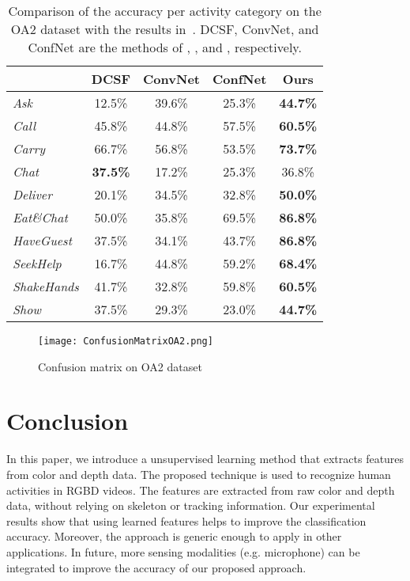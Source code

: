 \documentclass{article}
\begin{document}
\begin{table}[t]
\begin{center}
\caption{Comparison of the accuracy per activity category on the OA2 dataset with the results in~\cite{2014_Wang_ConvolutionalNetworks}. DCSF, ConvNet, and ConfNet are the methods of \cite{2013_Xia_DepthCuboid}, \cite{2013_Ji_3DNeuralNet}, and \cite{2014_Wang_ConvolutionalNetworks}, respectively.}
	\label{tab:OA2dataset2}
\begin{tabular}{|l|c|c|c|c|}
\hline
                    & DCSF       & ConvNet & ConfNet & Ours             \\ \hline
\textit{Ask}        & 12.5\%          & 39.6\%   & 25.3\%     & \textbf{44.7\%} \\ \hline
\textit{Call}       & 45.8\%          & 44.8\%   & 57.5\%     & \textbf{60.5\%} \\ \hline
\textit{Carry}      & 66.7\%          & 56.8\%   & 53.5\%     & \textbf{73.7\%} \\ \hline
\textit{Chat}       & \textbf{37.5\%} & 17.2\%   & 25.3\%     & 36.8\%          \\ \hline
\textit{Deliver}    & 20.1\%          & 34.5\%   & 32.8\%     & \textbf{50.0\%}    \\ \hline
\textit{Eat\&Chat}  & 50.0\%          & 35.8\%   & 69.5\%     & \textbf{86.8\%} \\ \hline
\textit{HaveGuest}  & 37.5\%          & 34.1\%   & 43.7\%     & \textbf{86.8\%} \\ \hline
\textit{SeekHelp}   & 16.7\%          & 44.8\%   & 59.2\%     & \textbf{68.4\%} \\ \hline
\textit{ShakeHands} & 41.7\%          & 32.8\%   & 59.8\%     & \textbf{60.5\%} \\ \hline
\textit{Show}       & 37.5\%          & 29.3\%   & 23.0\%     & \textbf{44.7\%} \\ \hline
\end{tabular}
\end{center}
\end{table}

\begin{figure}[!htb]
	\centering
	\texttt{[image: ConfusionMatrixOA2.png]}
	\caption{Confusion matrix on OA2 dataset~\cite{2014_Wang_ConvolutionalNetworks}}
	\label{fig:confusionmatrixoa2}
\end{figure}

\section{Conclusion}
\label{sec:conclusion}
In this paper, we introduce a unsupervised learning method that extracts features from color and depth data.
The proposed technique is used to recognize human activities in RGBD videos.
The features are extracted from raw color and depth data, without relying on skeleton or tracking information.
Our experimental results show that using learned features helps to improve the classification accuracy.
Moreover, the approach is generic enough to apply in other applications.
In future, more sensing modalities (e.g. microphone) can be integrated to improve the accuracy of our proposed approach.



\end{document}
